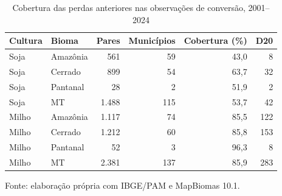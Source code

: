 \begin{table}[htbp]
\centering\small\captionstyle{\centering}\normalcaption
\caption{Cobertura das perdas anteriores nas observações de conversão, 2001--2024}\label{tab:h1b-cobertura}
\begin{tabular}{llrrrr}
\hline
Cultura & Bioma & Pares & Municípios & Cobertura (\%) & D20 \\
\hline
Soja & Amazônia & 561 & 59 & 43,0 & 8 \\
Soja & Cerrado & 899 & 54 & 63,7 & 32 \\
Soja & Pantanal & 28 & 2 & 51,9 & 2 \\
Soja & MT & 1.488 & 115 & 53,7 & 42 \\
Milho & Amazônia & 1.117 & 74 & 85,5 & 122 \\
Milho & Cerrado & 1.212 & 60 & 85,8 & 153 \\
Milho & Pantanal & 52 & 3 & 96,3 & 8 \\
Milho & MT & 2.381 & 137 & 85,9 & 283 \\
\hline
\end{tabular}
\par\smallskip\begin{minipage}{\textwidth}\footnotesize\centering
Fonte: elaboração própria com IBGE/PAM e MapBiomas 10.1.
\end{minipage}
\end{table}
